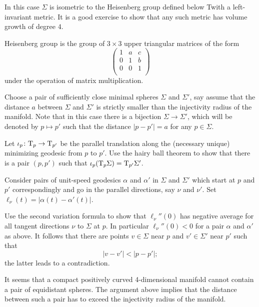 In this case $\Sigma$ is isometric to the Heisenberg group defined below Twith a left-invariant metric.
It is a good exercise to show that any such metric has volume  growth of degree $4$.

Heisenberg group
is the group of $3\times3$ upper triangular matrices of the form
\[\begin{pmatrix}
 1 & a & c\\
 0 & 1 & b\\
 0 & 0 & 1\\
\end{pmatrix}\]
under the operation of matrix multiplication. 
                                                      



Choose a pair of sufficiently close minimal spheres $\Sigma$ and $\Sigma'$,
say assume that the distance $a$ between $\Sigma$ and $\Sigma'$ is strictly smaller than the injectivity radius of the manifold.
Note that in this case there is a bijection $\Sigma\to \Sigma'$, which will be denoted by $p\mapsto p'$ such that the distance $|p-p'|=a$ for any $p\in\Sigma$.

Let $\iota_p\colon\mathrm{T}_p\to\mathrm{T}_{p'}$ be the parallel translation along the (necessary unique) minimizing geodesic from $p$ to $p'$.
Use the hairy ball theorem 
to show that there is a pair $(p,p')$ such that $\iota_p(\mathrm{T}_p\Sigma)=\mathrm{T}_{p'}\Sigma'$.

Consider pairs of unit-speed geodesics $\alpha$ and $\alpha'$ 
in $\Sigma$ and $\Sigma'$  
which start at $p$ and $p'$ correspondingly
and go in the parallel directions, say $\nu$ and $\nu'$. 
Set $\ell_\nu(t)=|\alpha(t)-\alpha'(t)|$.

Use the second variation formula to show that $\ell_\nu''(0)$ has negative average for all tangent directions $\nu$ to $\Sigma$ at $p$. 
In particular $\ell_\nu''(0)<0$ for a pair $\alpha$ and $\alpha'$ as above.
It follows that there are points $v\in\Sigma$ near $p$ 
and $v'\in\Sigma'$ near $p'$
such that 
\[|v-v'|<|p-p'|;\]
the latter leads to a contradiction.\qeds

It seems that a 
compact 
positively curved 
4-dimensional manifold
cannot contain a pair of equidistant spheres.
The argument above implies that the distance between such a pair has to exceed the injectivity radius of the manifold.

